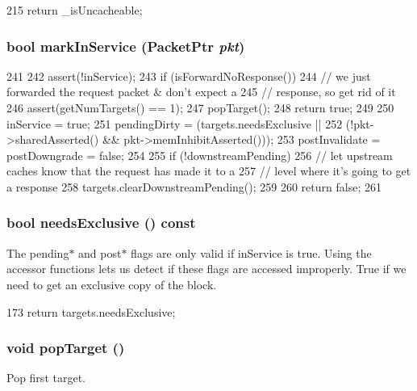 \begin{DoxyCode}
215 { return _isUncacheable; }
\end{DoxyCode}
\hypertarget{classMSHR_a89f5689827090dd1998bd3906e5454d1}{
\subsubsection[{markInService}]{\setlength{\rightskip}{0pt plus 5cm}bool markInService ({\bf PacketPtr} {\em pkt})}}
\label{classMSHR_a89f5689827090dd1998bd3906e5454d1}



\begin{DoxyCode}
241 {
242     assert(!inService);
243     if (isForwardNoResponse()) {
244         // we just forwarded the request packet & don't expect a
245         // response, so get rid of it
246         assert(getNumTargets() == 1);
247         popTarget();
248         return true;
249     }
250     inService = true;
251     pendingDirty = (targets.needsExclusive ||
252                     (!pkt->sharedAsserted() && pkt->memInhibitAsserted()));
253     postInvalidate = postDowngrade = false;
254 
255     if (!downstreamPending) {
256         // let upstream caches know that the request has made it to a
257         // level where it's going to get a response
258         targets.clearDownstreamPending();
259     }
260     return false;
261 }
\end{DoxyCode}
\hypertarget{classMSHR_aa8e449288b878ff3ff7f286eb4d28b6a}{
\subsubsection[{needsExclusive}]{\setlength{\rightskip}{0pt plus 5cm}bool needsExclusive () const}}
\label{classMSHR_aa8e449288b878ff3ff7f286eb4d28b6a}
The pending$\ast$ and post$\ast$ flags are only valid if inService is true. Using the accessor functions lets us detect if these flags are accessed improperly. True if we need to get an exclusive copy of the block. 


\begin{DoxyCode}
173 { return targets.needsExclusive; }
\end{DoxyCode}
\hypertarget{classMSHR_a660e7beed1d7d25852a9bc63d1f314b3}{
\subsubsection[{popTarget}]{\setlength{\rightskip}{0pt plus 5cm}void popTarget ()}}
\label{classMSHR_a660e7beed1d7d25852a9bc63d1f314b3}
Pop first target. 


